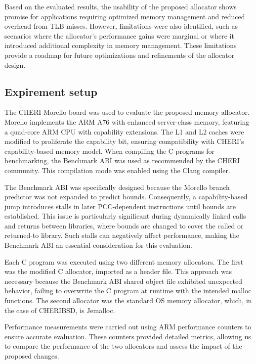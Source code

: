 \documentclass[11pt]{article}
\begin{document}
Based on the evaluated results, the usability of the proposed allocator shows promise 
for applications requiring optimized memory management and reduced overhead from TLB misses.
However, limitations were also identified, such as scenarios where the allocator's performance 
gains were marginal or where it introduced additional complexity in memory management. These 
limitations provide a roadmap for future optimizations and refinements of the allocator design.

\subsection{Expirement setup}
\label{sec:org1821dc1}

The CHERI Morello\cite{Morello} board was used to evaluate the proposed memory allocator. 
Morello implements the ARM A76 with enhanced server-class memory, featuring a 
quad-core ARM CPU with capability extensions. The L1 and L2 caches were modified 
to proliferate the capability bit, ensuring compatibility with CHERI's capability-based 
memory model. When compiling the C programs for benchmarking, the Benchmark ABI was 
used as recommended by the CHERI community. This compilation mode was enabled using 
the Clang compiler.

The Benchmark ABI\cite{BenchmarkABI} was specifically designed because the Morello branch predictor 
was not expanded to predict bounds. Consequently, a capability-based jump introduces 
stalls in later PCC-dependent instructions until bounds are established. This issue 
is particularly significant during dynamically linked calls and returns between 
libraries, where bounds are changed to cover the called or returned-to library. 
Such stalls can negatively affect performance, making the Benchmark ABI an essential 
consideration for this evaluation.

Each C program was executed using two different memory allocators. The first was 
the modified C allocator, imported as a header file. This approach was necessary 
because the Benchmark ABI shared object file exhibited unexpected behavior, 
failing to overwrite the C program at runtime with the intended malloc functions. 
The second allocator was the standard OS memory allocator, which, in the case of
CHERIBSD, is Jemalloc.

Performance measurements were carried out using ARM performance counters\cite{PerformanceCounter} to 
ensure accurate evaluation. These counters provided detailed metrics, allowing 
us to compare the performance of the two allocators and assess the impact of 
the proposed changes.
\end{document}
